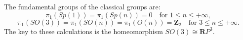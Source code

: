 The fundamental groups of the classical groups are:
$$\pi_1(Sp(1)) = \pi_1(Sp(n)) = 0 \quad \text{for } 1 \leq n \leq +\infty,$$
$$\pi_1(SO(3)) = \pi_1(SO(n)) = \pi_1(O(n)) = \mathbf{Z}_2 \quad \text{for } 3 \leq n \leq +\infty.$$
The key to these calculations is the homeomorphism $SO(3) \cong \mathbf{R}P^3$.
